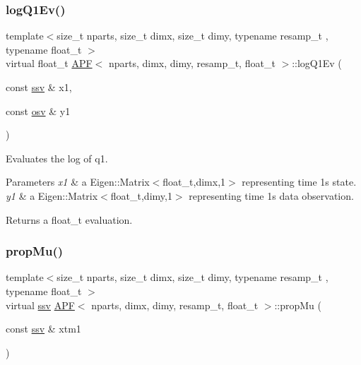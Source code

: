 \subsubsection{\texorpdfstring{log\+Q1\+Ev()}{logQ1Ev()}}
{\footnotesize\ttfamily template$<$size\+\_\+t nparts, size\+\_\+t dimx, size\+\_\+t dimy, typename resamp\+\_\+t , typename float\+\_\+t $>$ \\
virtual float\+\_\+t \hyperlink{classAPF}{A\+PF}$<$ nparts, dimx, dimy, resamp\+\_\+t, float\+\_\+t $>$\+::log\+Q1\+Ev (\begin{DoxyParamCaption}\item[{const \hyperlink{classAPF_a5f96da87f00ff75af1232f9021daf06a}{ssv} \&}]{x1,  }\item[{const \hyperlink{classAPF_aa8ac25c475e54ddf21999f28727a049e}{osv} \&}]{y1 }\end{DoxyParamCaption})\hspace{0.3cm}{\ttfamily [pure virtual]}}



Evaluates the log of q1. 


\begin{DoxyParams}{Parameters}
{\em x1} & a Eigen\+::\+Matrix$<$float\+\_\+t,dimx,1$>$ representing time 1\textquotesingle{}s state. \\
\hline
{\em y1} & a Eigen\+::\+Matrix$<$float\+\_\+t,dimy,1$>$ representing time 1\textquotesingle{}s data observation. \\
\hline
\end{DoxyParams}
\begin{DoxyReturn}{Returns}
a float\+\_\+t evaluation. 
\end{DoxyReturn}
\mbox{\label{classAPF_ab57f2f5fb1af1ef6f82fbe1ca3d20905}} 
\subsubsection{\texorpdfstring{prop\+Mu()}{propMu()}}
{\footnotesize\ttfamily template$<$size\+\_\+t nparts, size\+\_\+t dimx, size\+\_\+t dimy, typename resamp\+\_\+t , typename float\+\_\+t $>$ \\
virtual \hyperlink{classAPF_a5f96da87f00ff75af1232f9021daf06a}{ssv} \hyperlink{classAPF}{A\+PF}$<$ nparts, dimx, dimy, resamp\+\_\+t, float\+\_\+t $>$\+::prop\+Mu (\begin{DoxyParamCaption}\item[{const \hyperlink{classAPF_a5f96da87f00ff75af1232f9021daf06a}{ssv} \&}]{xtm1 }\end{DoxyParamCaption})\hspace{0.3cm}{\ttfamily [pure virtual]}}



